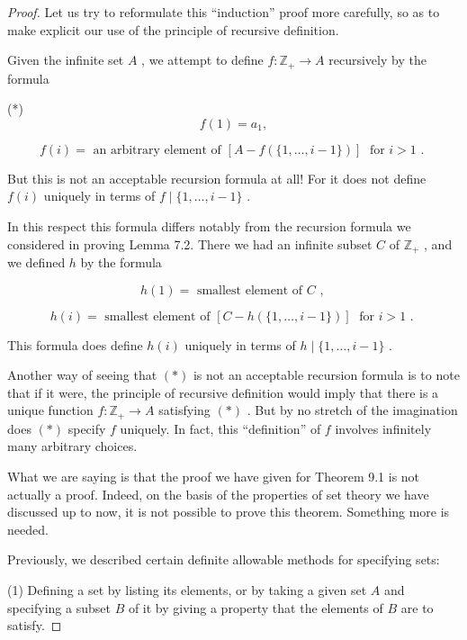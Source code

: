 \begin{proof}
Let us try to reformulate this ``induction'' proof more carefully, so as to make explicit our use of the principle of recursive definition.

Given the infinite set \(A\) , we attempt to define \(f : {\mathbb{Z}}_{ + } \rightarrow  A\) recursively by the formula

(*)
\[
f\left( 1\right)  = {a}_{1},
\]

\[
f\left( i\right)  = \text{ an arbitrary element of }\left\lbrack  {A - f\left( {\{ 1,\ldots ,i - 1\} }\right) }\right\rbrack  \;\text{ for }i > 1\text{ . }
\]

But this is not an acceptable recursion formula at all! For it does not define \(f\left( i\right)\) uniquely in terms of \(f \mid  \{ 1,\ldots ,i - 1\}\) .

In this respect this formula differs notably from the recursion formula we considered in proving Lemma 7.2. There we had an infinite subset \(C\) of \({\mathbb{Z}}_{ + }\) , and we defined \(h\) by the formula

\[
h\left( 1\right)  = \text{ smallest element of }C\text{ , }
\]

\[
h\left( i\right)  = \text{ smallest element of }\left\lbrack  {C - h\left( {\{ 1,\ldots ,i - 1\} }\right) }\right\rbrack  \;\text{ for }i > 1\text{ . }
\]

This formula does define \(h\left( i\right)\) uniquely in terms of \(h \mid  \{ 1,\ldots ,i - 1\}\) .

Another way of seeing that \(\left( *\right)\) is not an acceptable recursion formula is to note that if it were, the principle of recursive definition would imply that there is a unique function \(f : {\mathbb{Z}}_{ + } \rightarrow  A\) satisfying \(\left( *\right)\) . But by no stretch of the imagination does \(\left( *\right)\) specify \(f\) uniquely. In fact, this ``definition'' of \(f\) involves infinitely many arbitrary choices.

What we are saying is that the proof we have given for Theorem 9.1 is not actually a proof. Indeed, on the basis of the properties of set theory we have discussed up to now, it is not possible to prove this theorem. Something more is needed.

Previously, we described certain definite allowable methods for specifying sets:

(1) Defining a set by listing its elements, or by taking a given set \(A\) and specifying a subset \(B\) of it by giving a property that the elements of \(B\) are to satisfy.


\end{proof}
